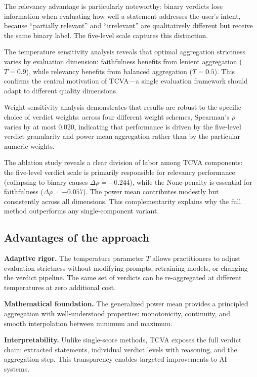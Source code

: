 \documentclass[sn-basic]{sn-jnl}
\theoremstyle{thmstyleone}%
\theoremstyle{thmstyletwo}%
\theoremstyle{thmstylethree}%
\begin{document}
The relevancy advantage is particularly noteworthy: binary verdicts lose information when evaluating how well a statement addresses the user's intent, because ``partially relevant'' and ``irrelevant'' are qualitatively different but receive the same binary label. The five-level scale captures this distinction.

The temperature sensitivity analysis reveals that optimal aggregation strictness varies by evaluation dimension: faithfulness benefits from lenient aggregation ($T = 0.9$), while relevancy benefits from balanced aggregation ($T = 0.5$). This confirms the central motivation of TCVA---a single evaluation framework should adapt to different quality dimensions.

Weight sensitivity analysis demonstrates that results are robust to the specific choice of verdict weights: across four different weight schemes, Spearman's $\rho$ varies by at most 0.020, indicating that performance is driven by the five-level verdict granularity and power mean aggregation rather than by the particular numeric weights.

The ablation study reveals a clear division of labor among TCVA components: the five-level verdict scale is primarily responsible for relevancy performance (collapsing to binary causes $\Delta\rho = -0.244$), while the None-penalty is essential for faithfulness ($\Delta\rho = -0.057$). The power mean contributes modestly but consistently across all dimensions. This complementarity explains why the full method outperforms any single-component variant.

\subsection{Advantages of the approach}

\textbf{Adaptive rigor.} The temperature parameter $T$ allows practitioners to adjust evaluation strictness without modifying prompts, retraining models, or changing the verdict pipeline. The same set of verdicts can be re-aggregated at different temperatures at zero additional cost.

\textbf{Mathematical foundation.} The generalized power mean \cite{Hwang1981,Kortvelesy2023,Derr2024} provides a principled aggregation with well-understood properties: monotonicity, continuity, and smooth interpolation between minimum and maximum.

\textbf{Interpretability.} Unlike single-score methods, TCVA exposes the full verdict chain: extracted statements, individual verdict levels with reasoning, and the aggregation step. This transparency enables targeted improvements to AI systems.
\end{document}
